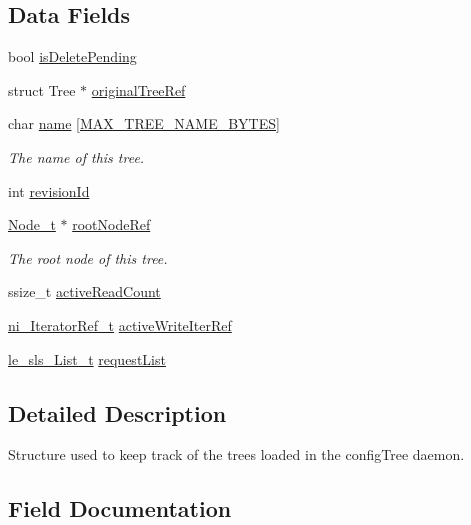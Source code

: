 \subsection*{Data Fields}
\begin{DoxyCompactItemize}
\item 
bool \hyperlink{struct_tree__t_a4d474850df8f2916f08d2df0fc2e19cf}{is\+Delete\+Pending}
\item 
struct Tree $\ast$ \hyperlink{struct_tree__t_a75173f5c0fb4cb33070e2b1c820e0d86}{original\+Tree\+Ref}
\item 
char \hyperlink{struct_tree__t_a03ee247b07de811714b1992b4702ac0a}{name} \mbox{[}\hyperlink{config_8c_ad0a6139c4ad7feceb227a5a6aa419954}{M\+A\+X\+\_\+\+T\+R\+E\+E\+\_\+\+N\+A\+M\+E\+\_\+\+B\+Y\+T\+ES}\mbox{]}
\begin{DoxyCompactList}\small\item\em The name of this tree. \end{DoxyCompactList}\item 
int \hyperlink{struct_tree__t_a7d48331e220d257dda8285ac9ef8d9c1}{revision\+Id}
\item 
\hyperlink{struct_node__t}{Node\+\_\+t} $\ast$ \hyperlink{struct_tree__t_afe42fdc017a177fcdcaa3a9e8fbbd255}{root\+Node\+Ref}
\begin{DoxyCompactList}\small\item\em The root node of this tree. \end{DoxyCompactList}\item 
ssize\+\_\+t \hyperlink{struct_tree__t_a8ae16e7f5a746e32de55fd94b84d1c80}{active\+Read\+Count}
\item 
\hyperlink{node_iterator_8h_a4e97d8e792de584da776be7c732785ba}{ni\+\_\+\+Iterator\+Ref\+\_\+t} \hyperlink{struct_tree__t_a224d1195c7ebca47df7ff3af94666e8e}{active\+Write\+Iter\+Ref}
\item 
\hyperlink{structle__sls___list__t}{le\+\_\+sls\+\_\+\+List\+\_\+t} \hyperlink{struct_tree__t_a4c1844aea3992bca846ef3b3060f0f59}{request\+List}
\end{DoxyCompactItemize}


\subsection{Detailed Description}
Structure used to keep track of the trees loaded in the config\+Tree daemon. 

\subsection{Field Documentation}
